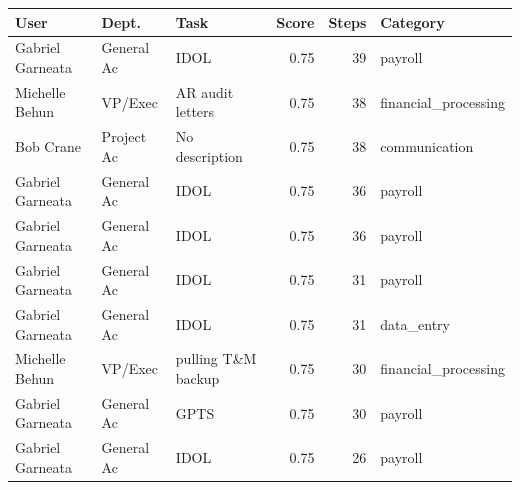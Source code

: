 \begin{tabular}{lllrrl}
\toprule
\textbf{User} & \textbf{Dept.} & \textbf{Task} & \textbf{Score} & \textbf{Steps} & \textbf{Category} \\
\midrule
Gabriel Garneata & General Ac & IDOL & 0.75 & 39 & payroll \\
Michelle Behun & VP/Exec & AR audit letters & 0.75 & 38 & financial\_processing \\
Bob Crane & Project Ac & No description & 0.75 & 38 & communication \\
Gabriel Garneata & General Ac & IDOL & 0.75 & 36 & payroll \\
Gabriel Garneata & General Ac & IDOL & 0.75 & 36 & payroll \\
Gabriel Garneata & General Ac & IDOL & 0.75 & 31 & payroll \\
Gabriel Garneata & General Ac & IDOL & 0.75 & 31 & data\_entry \\
Michelle Behun & VP/Exec & pulling T\&M backup & 0.75 & 30 & financial\_processing \\
Gabriel Garneata & General Ac & GPTS & 0.75 & 30 & payroll \\
Gabriel Garneata & General Ac & IDOL & 0.75 & 26 & payroll \\
\bottomrule
\end{tabular}